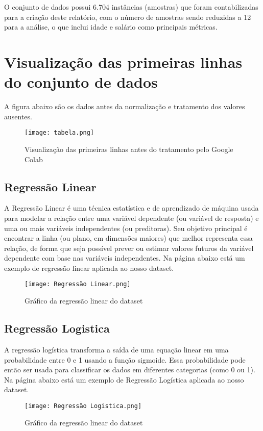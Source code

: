 \documentclass{article}
\begin{document}
O conjunto de dados possui 6.704 instâncias (amostras) que foram contabilizadas para a criação deste relatório, com o número de amostras sendo reduzidas a 12 para a análise, o que inclui idade e salário como principais métricas.


\section{Visualização das primeiras linhas do conjunto de dados}
A figura abaixo são os dados antes da normalização e tratamento dos valores ausentes.
\begin{figure}
\centering
\texttt{[image: tabela.png]}
\caption{\label{fig:frog}Visualização das primeiras linhas antes do tratamento pelo Google Colab}
\end{figure}

\newpage
\subsection{Regressão Linear}

A Regressão Linear é uma técnica estatística e de aprendizado de máquina usada para modelar a relação entre uma variável dependente (ou variável de resposta) e uma ou mais variáveis independentes (ou preditoras). Seu objetivo principal é encontrar a linha (ou plano, em dimensões maiores) que melhor representa essa relação, de forma que seja possível prever ou estimar valores futuros da variável dependente com base nas variáveis independentes.
Na página abaixo está um exemplo de regressão linear aplicada ao nosso dataset.
\begin{figure}
    \centering
    \texttt{[image: Regressão Linear.png]}
    \caption{\label{fig:frog}Gráfico da regressão linear do dataset}
\end{figure}

\subsection{Regressão Logistica}

A regressão logística transforma a saída de uma equação linear em uma probabilidade entre 0 e 1 usando a função sigmoide. Essa probabilidade pode então ser usada para classificar os dados em diferentes categorias (como 0 ou 1).
Na página abaixo está um exemplo de Regressão Logística aplicada ao nosso dataset.

\begin{figure}
    \centering
    \texttt{[image: Regressão Logistica.png]}
    \caption{\label{fig:frog}Gráfico da regressão linear do dataset}
\end{figure}
\end{document}
